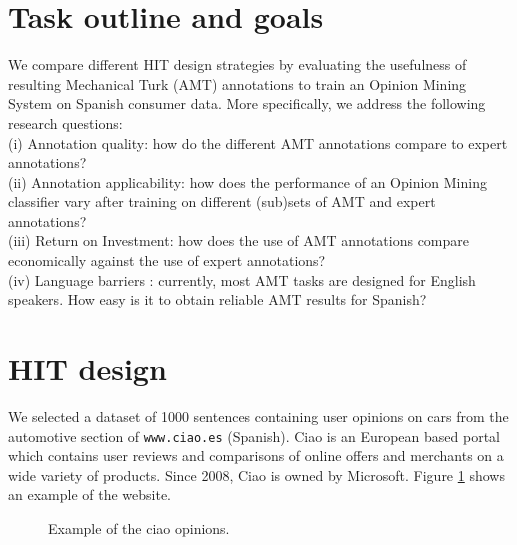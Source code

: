 \documentclass[11pt]{elsarticle}
\begin{document}
\section{Task outline and goals}
\label{sect:outline}

We compare different HIT design strategies by evaluating the usefulness of resulting Mechanical Turk (AMT) annotations to train an Opinion Mining System on Spanish consumer data. More specifically, we address the following research questions:\\
 \indent (i) Annotation quality: how do the different AMT annotations compare to expert annotations?\\
 \indent (ii) Annotation applicability: how does the performance of an Opinion Mining classifier vary after training on different (sub)sets of AMT and expert annotations?\\
 \indent (iii) Return on Investment: how does the use of AMT annotations compare economically against the use of expert annotations?\\
 \indent (iv) Language barriers \cite{irvine-klementiev:2010:MTURK}: currently, most AMT tasks are designed for English speakers. How easy is it to obtain reliable AMT results for Spanish?



\section{HIT design}
\label{sect:design}

We selected a dataset of 1000 sentences containing user opinions on cars from the automotive section of \texttt{www.ciao.es} (Spanish). Ciao is an European based portal which contains user reviews and comparisons of online offers and merchants on a wide variety of products. Since 2008, Ciao is owned by Microsoft. Figure \ref{ciao} shows an example of the website.
 


\begin{figure}[ht]
  \begin{center}
\caption{Example of the ciao opinions.}
\label{ciao}
  \end{center}
\end{figure}
\end{document}
